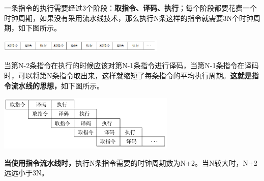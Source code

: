 一条指令的执行需要经过3个阶段：\textbf{{取指令、译码、执行}}{；}每个阶段都要花费一个时钟周期，如果没有采用流水线技术，那么执行N条这样的指令就需要3N个时钟周期，如下图所示。

\includegraphics[width=3.12500in,height=0.22917in]{png-jpeg-pics/8A2AC62E00E6340404E548DB75815AE5.png}

当第N-2条指令在执行的时候应该对第N-1条指令进行译码，当第N-1条指令在译码时，可以将第N条指令取出来，这样就缩短了每条指令的平均执行周期。\textbf{这就是指令流水线的思想，}如下图所示。

\includegraphics[width=3.33333in,height=1.04167in]{png-jpeg-pics/FF25CFF0348B51C2F179B1FBD64D1E66.png}

\textbf{当使用指令流水线时，}执行N条指令需要的时钟周期数为N+2。当N较大时，N+2远远小于3N。
